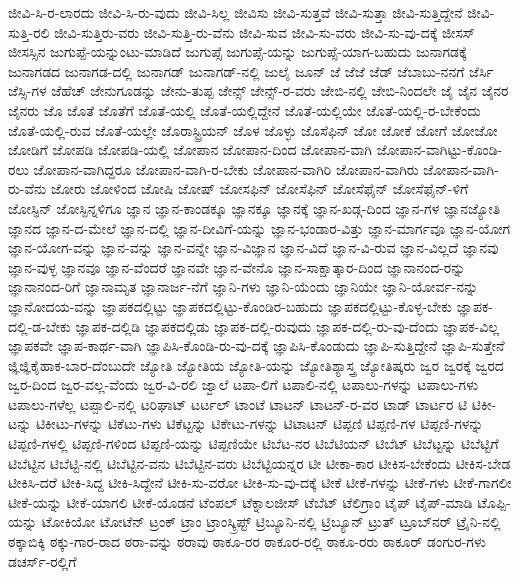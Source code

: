 {ಜೀವಿ-ಸಿ-ರ-ಲಾರದು
ಜೀವಿ-ಸಿ-ರು-ವುದು
ಜೀವಿ-ಸಿಲ್ಲ
ಜೀವಿಸು
ಜೀವಿ-ಸುತ್ತವೆ
ಜೀವಿ-ಸುತ್ತಾ
ಜೀವಿ-ಸುತ್ತಿದ್ದೇನೆ
ಜೀವಿ-ಸುತ್ತಿ-ರಲಿ
ಜೀವಿ-ಸುತ್ತಿರು-ವರು
ಜೀವಿ-ಸುತ್ತಿ-ರು-ವೆನು
ಜೀವಿ-ಸುವ
ಜೀವಿ-ಸು-ವರು
ಜೀವಿ-ಸು-ವು-ದಕ್ಕೆ
ಜೀಸಸ್
ಜೀಸಸ್ಸಿನ
ಜುಗುಪ್ಪೆ-ಯನ್ನುಂಟು-ಮಾಡಿದೆ
ಜುಗುಪ್ಸೆ
ಜುಗುಪ್ಸೆ-ಯನ್ನು
ಜುಗುಪ್ಸೆ-ಯಾಗ-ಬಹುದು
ಜುನಾಗಡಕ್ಕೆ
ಜುನಾಗಡದ
ಜುನಾಗಡ-ದಲ್ಲಿ
ಜುನಾಗಡ್
ಜುನಾಗಡ್‌-ನಲ್ಲಿ
ಜುಲೈ
ಜೂನ್
ಜೆ
ಜೆಜೆ
ಜೆಡ್
ಜೆಬಾಬು-ನನಗೆ
ಜೆರ್ಸಿ
ಜೆಸ್ಸಿ-ಗಳ
ಜೆಹೆಚ್
ಜೇನುಗೂಡನ್ನು
ಜೇನು-ತುಪ್ಪ
ಜೇನ್ಸ್
ಜೇನ್ಸ್‌-ರ-ವರು
ಜೇಬಿ-ನಲ್ಲಿ
ಜೇಬಿ-ನಿಂದಲೇ
ಜೈ
ಜೈನ
ಜೈನರ
ಜೈನರು
ಜೊ
ಜೊತೆ
ಜೊತೆಗೆ
ಜೊತೆ-ಯಲ್ಲಿ
ಜೊತೆ-ಯಲ್ಲಿದ್ದೇನೆ
ಜೊತೆ-ಯಲ್ಲಿಯೇ
ಜೊತೆ-ಯಲ್ಲಿ-ರ-ಬೇಕೆಂದು
ಜೊತೆ-ಯಲ್ಲಿ-ರುವ
ಜೊತೆ-ಯಲ್ಲೇ
ಜೊರಾಸ್ಟ್ರಿಯನ್
ಜೊಳ
ಜೊಳ್ಳು
ಜೊಸೆಫಿನ್
ಜೋ
ಜೋಕೆ
ಜೋಗೆ
ಜೋಜೋ
ಜೋಡಿಗೆ
ಜೋಪಡಿ
ಜೋಪಡಿ-ಯಲ್ಲಿ
ಜೋಪಾನ
ಜೋಪಾನ-ದಿಂದ
ಜೋಪಾನ-ವಾಗಿ
ಜೋಪಾನ-ವಾಗಿಟ್ಟು-ಕೊಂಡಿ-ರಲು
ಜೋಪಾನ-ವಾಗಿದ್ದರೂ
ಜೋಪಾನ-ವಾಗಿ-ರ-ಬೇಕು
ಜೋಪಾನ-ವಾಗಿರಿ
ಜೋಪಾನ-ವಾಗಿರು
ಜೋಪಾನ-ವಾಗಿ-ರು-ವೆನು
ಜೋರು
ಜೋಳಿಂದ
ಜೋಷಿ
ಜೋಷ್
ಜೋಸಫಿನ್
ಜೋಸೆಫಿನ್
ಜೋಸೆಫೈನ್
ಜೋಸೆಫೈನ್‌-ಳಿಗೆ
ಜೋಸ್ಫಿನ್
ಜೋಸ್ಫಿನ್ನಳಿಗೂ
ಜ್ಞಾನ
ಜ್ಞಾನ-ಕಾಂಡಕ್ಕೂ
ಜ್ಞಾನಕ್ಕೂ
ಜ್ಞಾನಕ್ಕೆ
ಜ್ಞಾನ-ಖಡ್ಗ-ದಿಂದ
ಜ್ಞಾನ-ಗಳ
ಜ್ಞಾನಜ್ಯೋತಿ
ಜ್ಞಾನದ
ಜ್ಞಾನ-ದ-ಮೇಲೆ
ಜ್ಞಾನ-ದಲ್ಲಿ
ಜ್ಞಾನ-ದೀವಿಗೆ-ಯನ್ನು
ಜ್ಞಾನ-ಭಂಡಾರ-ವಿತ್ತು
ಜ್ಞಾನ-ಮಾರ್ಗವೂ
ಜ್ಞಾನ-ಯೋಗ
ಜ್ಞಾನ-ಯೋಗ-ವನ್ನು
ಜ್ಞಾನ-ವನ್ನು
ಜ್ಞಾನ-ವನ್ನೇ
ಜ್ಞಾನ-ವಿಜ್ಞಾನ
ಜ್ಞಾನ-ವಿದೆ
ಜ್ಞಾನ-ವಿ-ರುವ
ಜ್ಞಾನ-ವಿಲ್ಲದೆ
ಜ್ಞಾನವು
ಜ್ಞಾನ-ವುಳ್ಳ
ಜ್ಞಾನವೂ
ಜ್ಞಾನ-ವೆಂದರೆ
ಜ್ಞಾನವೇ
ಜ್ಞಾನ-ವೇನೊ
ಜ್ಞಾನ-ಸಾಕ್ಷಾತ್ಕಾರ-ದಿಂದ
ಜ್ಞಾನಾನಂದ-ರನ್ನು
ಜ್ಞಾನಾನಂದ-ರಿಗೆ
ಜ್ಞಾನಾಮೃತ
ಜ್ಞಾನಾರ್ಜ-ನೆಗೆ
ಜ್ಞಾನಿ-ಗಳು
ಜ್ಞಾನಿ-ಯೆಂದು
ಜ್ಞಾನಿಯೇ
ಜ್ಞಾನಿ-ಯೋರ್ವ-ನನ್ನು
ಜ್ಞಾನೋದಯ-ವನ್ನು
ಜ್ಞಾಪಕದಲ್ಲಿಟ್ಟು
ಜ್ಞಾಪಕದಲ್ಲಿಟ್ಟು-ಕೊಂಡಿರ-ಬಹುದು
ಜ್ಞಾಪಕದಲ್ಲಿಟ್ಟು-ಕೊಳ್ಳ-ಬೇಕು
ಜ್ಞಾಪಕ-ದಲ್ಲಿ-ಡ-ಬೇಕು
ಜ್ಞಾಪಕ-ದಲ್ಲಿಡಿ
ಜ್ಞಾಪಕದಲ್ಲಿಡು
ಜ್ಞಾಪಕ-ದಲ್ಲಿ-ರುವುದು
ಜ್ಞಾಪಕ-ದಲ್ಲಿ-ರು-ವು-ದೆಂದು
ಜ್ಞಾಪಕ-ವಿಲ್ಲ
ಜ್ಞಾಪಕವೇ
ಜ್ಞಾಪ-ಕಾರ್ಥ-ವಾಗಿ
ಜ್ಞಾಪಿಸಿ-ಕೊಂಡಿ-ರು-ವು-ದಕ್ಕೆ
ಜ್ಞಾಪಿಸಿ-ಕೊಂಡುದು
ಜ್ಞಾಪಿ-ಸುತ್ತಿದ್ದೇನೆ
ಜ್ಞಾಪಿ-ಸುತ್ತೇನೆ
ಜ್ಞಿಜ್ಞಿಕೈಹಾಕ-ಬಾರ-ದೆಂಬುದೇ
ಜ್ಯೋತಿ
ಜ್ಯೋತಿಯ
ಜ್ಯೋತಿ-ಯನ್ನು
ಜ್ಯೋತಿಶ್ಯಾಸ್ತ್ರ
ಜ್ಯೋತಿಷ್ಕರು
ಜ್ವರ
ಜ್ವರಕ್ಕೆ
ಜ್ವರದ
ಜ್ವರ-ದಿಂದ
ಜ್ವರ-ವಲ್ಲ-ವೆಂದು
ಜ್ವರ-ವಿ-ರಲಿ
ಜ್ವಾಲೆ
ಟಪಾ-ಲಿಗೆ
ಟಪಾಲಿ-ನಲ್ಲಿ
ಟಪಾಲು-ಗಳನ್ನು
ಟಪಾಲು-ಗಳು
ಟಪಾಲು-ಗಳೆಲ್ಲ
ಟಪ್ಪಾಲಿ-ನಲ್ಲಿ
ಟರಿಘಾಟ್
ಟರ್ಟಲ್
ಟಾಂಟೆ
ಟಾಟನ್
ಟಾಟನ್‌-ರ-ವರ
ಟಾಡ್
ಟಾರ್ಟರ
ಟಿ
ಟಿಕೀ-ಟನ್ನು
ಟಿಕೀಟು-ಗಳನ್ನು
ಟಿಕೆಟು-ಗಳು
ಟಿಕೆಟ್ಟನ್ನು
ಟಿಕೇಟು-ಗಳನ್ನು
ಟಿಟಾಟನ್
ಟಿಪ್ಪಣಿ
ಟಿಪ್ಪಣಿ-ಗಳ
ಟಿಪ್ಪಣಿ-ಗಳನ್ನು
ಟಿಪ್ಪಣಿ-ಗಳಲ್ಲಿ
ಟಿಪ್ಪಣಿ-ಗಳಿಂದ
ಟಿಪ್ಪಣಿ-ಯನ್ನು
ಟಿಪ್ಪಣಿಯೇ
ಟಿಬೆಟ-ನರ
ಟಿಬೆಟಿಯನ್
ಟಿಬೆಟ್
ಟಿಬೆಟ್ಟನ್ನು
ಟಿಬೆಟ್ಟಿಗೆ
ಟಿಬೆಟ್ಟಿನ
ಟಿಬೆಟ್ಟಿ-ನಲ್ಲಿ
ಟಿಬೆಟ್ಟಿನ-ವನು
ಟಿಬೆಟ್ಟಿನ-ವರು
ಟಿಬೆಟ್ಟಿಯನ್ನರ
ಟೀ
ಟೀಕಾ-ಕಾರ
ಟೀಕಿಸ-ಬೇಕೆಂದು
ಟೀಕಿಸ-ಬೇಡ
ಟೀಕಿಸಿ-ದರೆ
ಟೀಕಿ-ಸಿದ್ದ
ಟೀಕಿ-ಸಿದ್ದೇನೆ
ಟೀಕಿ-ಸು-ವರೋ
ಟೀಕಿ-ಸು-ವು-ದಕ್ಕೆ
ಟೀಕೆ
ಟೀಕೆ-ಗಳನ್ನು
ಟೀಕೆ-ಗಳು
ಟೀಕೆ-ಗಾಗಲೀ
ಟೀಕೆ-ಯನ್ನು
ಟೀಕೆ-ಯಾಗಲಿ
ಟೀಕೆ-ಯೊಡನೆ
ಟೆಂಪಲ್
ಟೆಕ್ನಾಲಜೀಸ್
ಟೆಬೆಟ್
ಟೆಲಿಗ್ರಾಂ
ಟೈಪ್
ಟೈಪ್‌-ಮಾಡಿ
ಟೊಪ್ಪಿ-ಯನ್ನು
ಟೋಕಿಯೋ
ಟೋಟೆನ್
ಟ್ರಂಕ್
ಟ್ರಾಂ
ಟ್ರಾಂಸ್ಕ್ರಿಪ್ಟ್
ಟ್ರಿಬ್ಯೂನಿ-ನಲ್ಲಿ
ಟ್ರಿಬ್ಯೂನ್
ಟ್ರುತ್
ಟ್ರೂಬ್‌ನರ್‌
ಟ್ರೈನಿ-ನಲ್ಲಿ
ಠಕ್ಕಾಬಿಕ್ಕಿ
ಠಕ್ಕು-ಗಾರ-ರಾದ
ಠರಾ-ವನ್ನು
ಠರಾವು
ಠಾಕೂ-ರರ
ಠಾಕೂರ-ರಲ್ಲಿ
ಠಾಕೂ-ರರು
ಠಾಕೂರ್
ಡಂಗುರ-ಗಳು
ಡಚರ್ಸ್‌-ರಲ್ಲಿಗೆ
}
